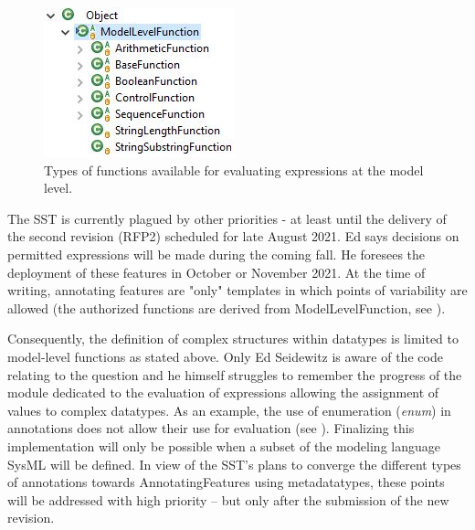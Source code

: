 \begin{figure}[ht]     
	\centering
	\includegraphics[width=.35\linewidth]{images/modellevelfunction-type-hierarchy.JPG}
	\caption{Types of functions available for evaluating expressions at the model level.}
	\label{fig:modellevelfunc}
\end{figure}

The SST is currently plagued by other priorities - at least until the delivery of the second revision (RFP2) scheduled for late August 2021. Ed says decisions on permitted expressions will be made during the coming fall. He foresees the deployment of these features in October or November 2021. At the time of writing, annotating features are "only" templates in which points of variability are allowed (the authorized functions are derived from ModelLevelFunction, see ).

Consequently, the definition of complex structures within datatypes is limited to model-level functions as stated above. Only Ed Seidewitz is aware of the code relating to the question and he himself struggles to remember the progress of the module dedicated to the evaluation of expressions allowing the assignment of values to complex datatypes. As an example, the use of enumeration (\textit{enum}) in annotations does not allow their use for evaluation (see ). 
Finalizing this implementation will only be possible when a subset of the modeling language SysML will be defined. In view of the SST's plans to converge the different types of annotations towards AnnotatingFeatures using metadatatypes, these points will be addressed with high priority -- but only after the submission of the new revision.

